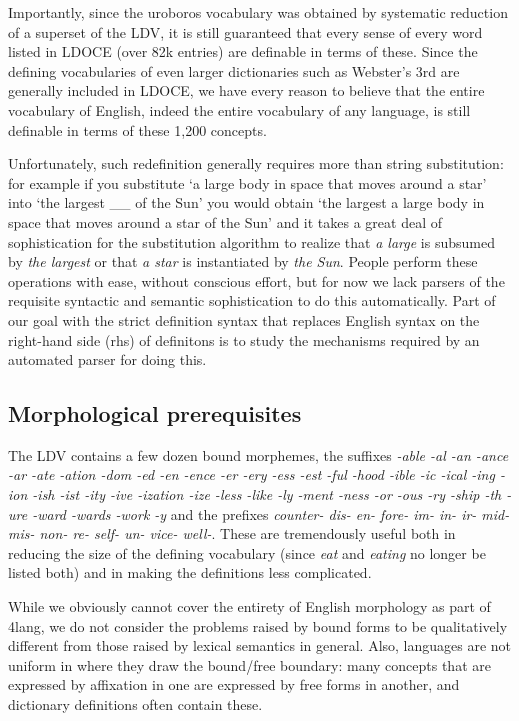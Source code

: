 \documentclass[11pt,bookmarks,bookmarksnumbered,naturalnames,plainpages=false,pdftex,colorlinks=true,urlcolor=blue,bookmarksdepth=subsection,plainpages=false]{paper}
\begin{document}
Importantly, since the uroboros vocabulary was obtained by systematic
reduction of a superset of the LDV, it is still guaranteed that every sense of
every word listed in LDOCE (over 82k entries) are definable in terms of
these. Since the defining vocabularies of even larger dictionaries such as
Webster's 3rd \citep{Merriam:1961} are generally included in LDOCE, we have
every reason to believe that the entire vocabulary of English, indeed the
entire vocabulary of any language, is still definable in terms of these 1,200
concepts. 

Unfortunately, such redefinition generally requires more than string
substitution: for example if you substitute `a large body in space that moves
around a star' into `the largest \_\_ of the Sun' you would obtain `the
largest a large body in space that moves around a star of the Sun' and it
takes a great deal of sophistication for the substitution algorithm to realize
that {\it a large} is subsumed by {\it the largest} or that {\it a star} is
instantiated by {\it the Sun}. People perform these operations with ease,
without conscious effort, but for now we lack parsers of the requisite
syntactic and semantic sophistication to do this automatically. Part of our
goal with the strict definition syntax that replaces English syntax on the
right-hand side (rhs) of definitons is to study the mechanisms required by an
automated parser for doing this. 

\subsection{Morphological prerequisites}\label{morphology}

The LDV contains a few dozen bound morphemes, the suffixes {\it -able -al -an
  -ance -ar -ate -ation -dom -ed -en -ence -er -ery -ess -est -ful -hood -ible -ic
  -ical -ing -ion -ish -ist -ity -ive -ization -ize -less -like -ly -ment
  -ness -or -ous -ry -ship -th -ure -ward -wards -work -y} and the prefixes
{\it counter- dis- en- fore- im- in- ir- mid- mis- non- re- self- un- vice-
  well-}.  These are tremendously useful both in reducing the size of the
defining vocabulary (since {\it eat} and {\it eating} no longer be listed
both) and in making the definitions less complicated.

While we obviously cannot cover the entirety of English morphology as part of
4lang, we do not consider the problems raised by bound forms to be
qualitatively different from those raised by lexical semantics in
general. Also, languages are not uniform in where they draw the bound/free
boundary: many concepts that are expressed by affixation in one are expressed
by free forms in another, and dictionary definitions often contain these.
\end{document}
